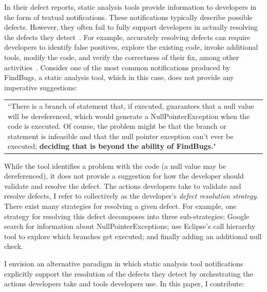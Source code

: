 \documentclass{sig-alternate}
\begin{document}
In their defect reports, static analysis tools provide information to developers in the form of textual notifications.
These notifications typically describe possible defects.
However, they often fail to fully support developers in actually resolving the defects they detect~\cite{Johnson2013}.
For example, accurately resolving defects can require developers to identify false positives, explore the existing code, invoke additional tools, modify the code, and verify the correctness of their fix, among other activities~\cite{Smith2015}.  
Consider one of the most common \cite{Ayewah2007} notifications produced by FindBugs, a static analysis tool, which in this case, does not provide any imperative suggestions:


\vspace{2mm}

\begin{tabular}{|p{7.5cm}}
	``There is a branch of statement that, if executed, guarantees that a null value will be dereferenced, which would generate a NullPointerException when the code is executed. Of course, the problem might be that the branch or statement is infeasible and that the null pointer exception can't ever be executed; \textbf{deciding that is beyond the ability of FindBugs.}"\\
\end{tabular}
\vspace{2mm}

\noindent
While the tool identifies a problem with the code (a null value may be dereferenced), it does not provide a suggestion for how the developer should validate and resolve the defect.
The actions developers take to validate and resolve defects, I refer to collectively as the developer's \textit{defect resolution strategy}.
There exist many strategies for resolving a given defect.
For example, one strategy for resolving this defect decomposes into three sub-strategies: Google search for information about NullPointerExceptions; use Eclipse's call hierarchy tool to explore which branches get executed; and finally adding an additional null check.

I envision an alternative paradigm in which static analysis tool notifications explicitly support the resolution of the defects they detect by orchestrating the actions developers take and tools developers use.
In this paper, I contribute: 
\end{document}
